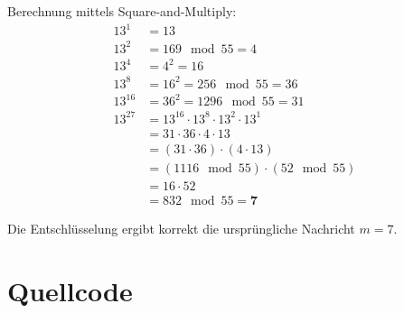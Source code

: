 \documentclass[
	fontsize=12pt,
	paper=a4,
	numbers=noenddot,
	listof=totoc,
	listof=entryprefix,
	listof=nochaptergap,
	bibliography=totoc,
	parskip=half,
	openany
]{scrbook}
\begin{document}
Berechnung mittels Square-and-Multiply:
\begin{align*}
	13^1    & = 13                                                   \\
	13^2    & = 169 \mod 55 = 4                                      \\
	13^4    & = 4^2 = 16                                             \\
	13^8    & = 16^2 = 256 \mod 55 = 36                              \\
	13^{16} & = 36^2 = 1296 \mod 55 = 31                             \\
	13^{27} & = 13^{16} \cdot 13^{8} \cdot 13^{2} \cdot 13^{1}      \\
	        & = 31 \cdot 36 \cdot 4 \cdot 13                         \\
	        & = (31 \cdot 36) \cdot (4 \cdot 13)                     \\
	        & = (1116 \mod 55) \cdot (52 \mod 55)                    \\
	        & = 16 \cdot 52                                          \\
	        & = 832 \mod 55 = \mathbf{7}
\end{align*}

Die Entschlüsselung ergibt korrekt die ursprüngliche Nachricht $m = 7$.

\section*{Quellcode}



\end{document}
